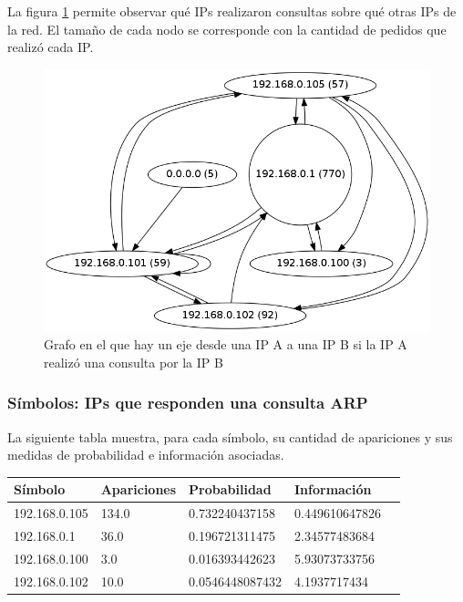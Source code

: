 \documentclass{article}
\begin{document}
La figura \ref{fig:red2requesters:graph} permite observar qué IPs realizaron
consultas sobre qué otras IPs de la red. El tamaño de cada nodo se corresponde
con la cantidad de pedidos que realizó cada IP.

\begin{figure}[h!]
    \centering
    \includegraphics[width=350pt]{red2/red2requestersgraph.png}
    \caption{Grafo en el que hay un eje desde una IP A a una IP B si la IP A
        realizó una consulta por la IP B}
    \label{fig:red2requesters:graph}
\end{figure}


\newpage

\subsubsection{Símbolos: IPs que responden una consulta ARP}
La siguiente tabla muestra, para cada símbolo, su cantidad de apariciones y
sus medidas de probabilidad e información asociadas.

\vskip10pt

\begin{tabular}{|l|l|l|l|l|}
  \hline
  Símbolo & Apariciones & Probabilidad & Información \\
  \hline
  192.168.0.105 & 134.0 & 0.732240437158 & 0.449610647826\\
\hline
192.168.0.1 & 36.0 & 0.196721311475 & 2.34577483684\\
\hline
192.168.0.100 & 3.0 & 0.016393442623 & 5.93073733756\\
\hline
192.168.0.102 & 10.0 & 0.0546448087432 & 4.1937717434\\
\hline
\end{tabular}\\
\end{document}
